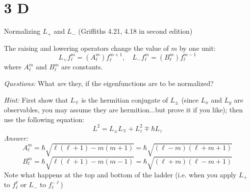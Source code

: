 \documentclass{article}
\begin{document}
\section*{3 D}
\begin{ques}\label{q3}
Normalizing $L_+$ and $L_-$ (Griffiths 4.21, 4.18 in second edition)

The raising and lowering operators change the value of $m$ by one unit:
$$L_+ f_\ell^m = (A_\ell^m)f_\ell^{m+1},\quad L_- f_\ell^m = (B_\ell^m)f_\ell^{m-1}$$
where $A_\ell^m$ and $B_\ell^m$ are constants. 

\emph{Questions:} What \emph{are} they, if the eigenfunctions are to be normalized?

\emph{Hint:} First show that $L_\mp$ is the hermitian conjugate of $L_\pm$ (since $L_x$ and $L_y$ are observables, you may assume they are hermition...but prove it if you like); then use the following equation:
$$L^2 = L_\pm L_\mp + L_z^2 \mp \hbar L_z$$
\emph{Answer:}
$$A_\ell^m = \hbar\sqrt{\ell(\ell+1)-m(m+1)} = \hbar\sqrt{(\ell-m)(\ell+m+1)}$$
$$B_\ell^m = \hbar\sqrt{\ell(\ell+1)-m(m-1)}=\hbar\sqrt{(\ell+m)(\ell-m+1)}$$
Note what happens at the top and bottom of the ladder (i.e. when you apply $L_+$ to $f_\ell^\ell$ or $L_-$ to $f_\ell^{-\ell}$)
\end{ques}
\end{document}
